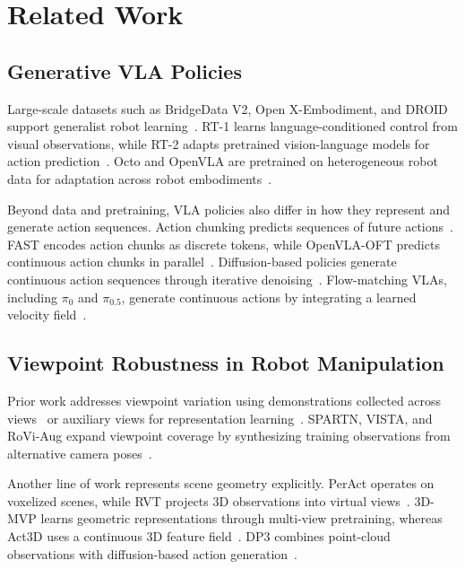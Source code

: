 \documentclass{ELSP}
\begin{document}
\section{Related Work}

\subsection{Generative VLA Policies}

Large-scale datasets such as BridgeData V2, Open X-Embodiment, and DROID support generalist robot learning~\cite{pmlr-v229-walke23a,10611477,Khazatsky-RSS-24}. RT-1 learns language-conditioned control from visual observations, while RT-2 adapts pretrained vision-language models for action prediction~\cite{Brohan-RSS-23,pmlr-v229-zitkovich23a}. Octo and OpenVLA are pretrained on heterogeneous robot data for adaptation across robot embodiments~\cite{Ghosh-RSS-24,pmlr-v270-kim25c}.

Beyond data and pretraining, VLA policies also differ in how they represent and generate action sequences. Action chunking predicts sequences of future actions~\cite{Zhao-RSS-23}. FAST encodes action chunks as discrete tokens, while OpenVLA-OFT predicts continuous action chunks in parallel~\cite{PertschK-RSS-25,KimM1-RSS-25}. Diffusion-based policies generate continuous action sequences through iterative denoising~\cite{doi:10.1177/02783649241273668,Ze-RSS-24,ICLR2025_49f80e4d,pmlr-v267-wen25g}. Flow-matching VLAs, including $\pi_0$ and $\pi_{0.5}$, generate continuous actions by integrating a learned velocity field~\cite{BlackK-RSS-25,pmlr-v305-black25a}.


\subsection{Viewpoint Robustness in Robot Manipulation}

Prior work addresses viewpoint variation using demonstrations collected across views~\cite{9636440} or auxiliary views for representation learning~\cite{pmlr-v202-seo23a}. SPARTN, VISTA, and RoVi-Aug expand viewpoint coverage by synthesizing training observations from alternative camera poses~\cite{Zhou_2023_CVPR,pmlr-v270-tian25a,pmlr-v270-chen25a}.

Another line of work represents scene geometry explicitly. PerAct operates on voxelized scenes, while RVT projects 3D observations into virtual views~\cite{pmlr-v205-shridhar23a,pmlr-v229-goyal23a}. 3D-MVP learns geometric representations through multi-view pretraining, whereas Act3D uses a continuous 3D feature field~\cite{Qian_2025_CVPR,pmlr-v229-gervet23a}. DP3 combines point-cloud observations with diffusion-based action generation~\cite{Ze-RSS-24}.
\end{document}
